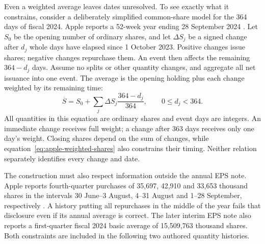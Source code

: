 Even a weighted average leaves dates unresolved. To see exactly what it
constrains, consider a deliberately simplified common-share model for the
364 days of fiscal 2024. Apple reports a 52-week year ending 28 September
2024 \citep[Note 1, printed p.~34]{apple2024}. Let $S_0$ be the opening number
of ordinary shares, and let $\Delta S_j$ be a signed change after $d_j$ whole
days have elapsed since 1 October 2023. Positive changes issue shares;
negative changes repurchase them. An event then affects the remaining
$364-d_j$ days. Assume no splits or other quantity changes, and aggregate all
net issuance into one event. The average is the opening holding plus each
change weighted by its remaining time:
\begin{equation}
 \overline S=S_0+\sum_j\Delta S_j\frac{364-d_j}{364},
 \qquad 0\leq d_j<364.
 \label{eq:apple-weighted-shares}
\end{equation}
All quantities in this equation are ordinary shares and event days are integers.
An immediate change receives full weight; a change after 363 days receives
only one day's weight. Closing shares depend on the sum of changes, while
equation~\eqref{eq:apple-weighted-shares} also constrains their timing. Neither
relation separately identifies every change and date.

The construction must also respect information outside the annual EPS note.
Apple reports fourth-quarter purchases of 35,697, 42,910 and 33,653 thousand
shares in the intervals 30 June--3 August, 4--31 August and 1--28 September,
respectively \citep[Item 5, printed p.~19]{apple2024}. A history putting all
repurchases in the middle of the year fails that disclosure even if its annual
average is correct. The later interim EPS note also reports a first-quarter
fiscal 2024 basic average of 15,509,763 thousand shares. Both constraints are
included in the following two authored quantity histories.

